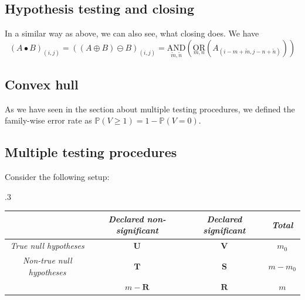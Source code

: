 \documentclass{beamer}
\begin{document}
\begin{frame}
	\subsection{Hypothesis testing and closing}
	In a similar way as above, we can also see, what closing does. We have
	\begin{equation*}
		(A \bullet B)_{(i, j)} = ((A \oplus B) \ominus B)_{(i, j)} = \underset{\tilde{m}, \tilde{n}}{\mathrm{AND}} \left( \underset{m, n}{\mathrm{OR}} ( A_{(i - m + \tilde{m}, j - n + \tilde{n})} ) \right)
	\end{equation*}
\end{frame}

\begin{frame}
	\subsection{Convex hull}
	
	As we have seen in the section about multiple testing procedures, we defined the family-wise error rate as $\mathbb{P}(V \geq 1) = 1 - \mathbb{P}(V = 0)$.
\end{frame}

\begin{frame}
	\section{Multiple testing procedures}
	
	Consider the following setup:
	\begin{table}[h]
		\tymax .3\textwidth
		\begin{tabulary}{\textwidth}{|CCCC|}
			\hline
			& \textit{Declared non-significant} & \textit{Declared significant} & \textit{Total} \\
			\hline
			\textit{True null hypotheses} & $\mathbf{U}$ & $\mathbf{V}$ & $m_0$ \\
			\textit{Non-true null hypotheses} & $\mathbf{T}$ & $\mathbf{S}$ & $m - m_0$ \\
			& $m - \mathbf{R}$ & $\mathbf{R}$ & $m$ \\
			\hline
		\end{tabulary}
	\end{table}
\end{frame}
\end{document}
